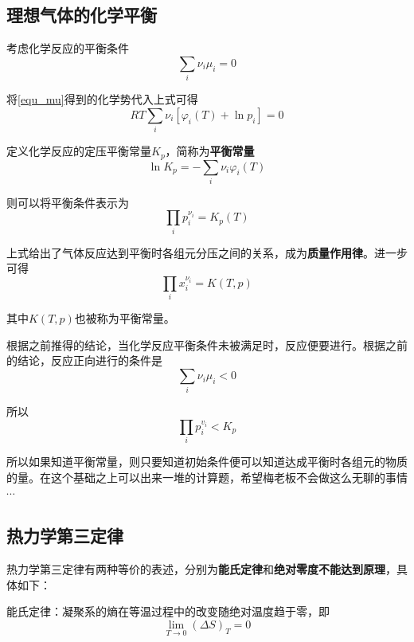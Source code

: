 \documentclass[UTF8]{ctexart}
\begin{document}
	\subsection{理想气体的化学平衡}
	考虑化学反应的平衡条件
	\begin{equation}
	\sum_{i} \nu_{i} \mu_{i}=0
	\end{equation}
	
\noindent 将\ref{equ_mu}得到的化学势代入上式可得
\begin{equation}
R T \sum_{i} \nu_{i}\left[\varphi_{i}(T)+\ln p_{i}\right]=0
\end{equation}

\noindent 定义化学反应的定压平衡常量$ K_{p} $，简称为\textbf{平衡常量}
\begin{equation}
\ln K_{p}=-\sum_{i} \nu_{i} \varphi_{i}(T)
\end{equation}

\noindent 则可以将平衡条件表示为
\begin{equation}
\prod_{i} p_{i}^{\nu_{i}}=K_{p}(T)
\end{equation}

\noindent 上式给出了气体反应达到平衡时各组元分压之间的关系，成为\textbf{质量作用律}。进一步可得
\begin{equation}
\prod_{i} x_{i}^{\nu_{i}}=K(T, p)
\end{equation}

\noindent 其中$ K(T,p) $也被称为平衡常量。

	根据之前推得的结论，当化学反应平衡条件未被满足时，反应便要进行。根据之前的结论，反应正向进行的条件是
	\begin{equation}
	\sum_{i} \nu_{i} \mu_{i}<0
	\end{equation}
	
\noindent 所以
\begin{equation}
\prod_{i} p_{i}^{v_{i}}<K_{p}
\end{equation}

\noindent 所以如果知道平衡常量，则只要知道初始条件便可以知道达成平衡时各组元的物质的量。在这个基础之上可以出来一堆的计算题，希望梅老板不会做这么无聊的事情$ \cdots $

	\subsection{热力学第三定律}
	热力学第三定律有两种等价的表述，分别为\textbf{能氏定律}和\textbf{绝对零度不能达到原理}，具体如下：
	
	能氏定律：凝聚系的熵在等温过程中的改变随绝对温度趋于零，即
	\begin{equation}
	\lim _{T \rightarrow 0}(\Delta S)_{T}=0
	\end{equation}
	
\end{document}
